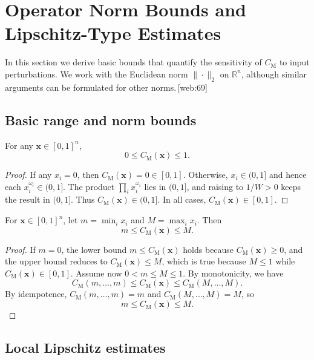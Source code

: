 \documentclass[11pt]{article}
\begin{document}
\section{Operator Norm Bounds and Lipschitz-Type Estimates}

In this section we derive basic bounds that quantify the sensitivity of $C_{\mathrm{M}}$ to input perturbations. 
We work with the Euclidean norm $\|\cdot\|_2$ on $\mathbb{R}^n$, although similar arguments can be formulated for other norms.\,[web:69] 

\subsection{Basic range and norm bounds}

\begin{proposition}[Range]
For any $\mathbf{x} \in [0,1]^n$, 
\[
0 \le C_{\mathrm{M}}(\mathbf{x}) \le 1.
\]
\end{proposition}

\begin{proof}
If any $x_i=0$, then $C_{\mathrm{M}}(\mathbf{x})=0\in[0,1]$. 
Otherwise, $x_i\in(0,1]$ and hence each $x_i^{\omega_i}\in(0,1]$. 
The product $\prod_i x_i^{\omega_i}$ lies in $(0,1]$, and raising to $1/W>0$ keeps the result in $(0,1]$. 
Thus $C_{\mathrm{M}}(\mathbf{x})\in(0,1]$. 
In all cases, $C_{\mathrm{M}}(\mathbf{x}) \in [0,1]$.
\end{proof}

\begin{proposition}
For $\mathbf{x} \in [0,1]^n$, let $m = \min_i x_i$ and $M = \max_i x_i$. 
Then
\[
m \le C_{\mathrm{M}}(\mathbf{x}) \le M.
\]
\end{proposition}

\begin{proof}
If $m=0$, the lower bound $m \le C_{\mathrm{M}}(\mathbf{x})$ holds because $C_{\mathrm{M}}(\mathbf{x}) \ge 0$, and the upper bound reduces to $C_{\mathrm{M}}(\mathbf{x})\le M$, which is true because $M \le 1$ while $C_{\mathrm{M}}(\mathbf{x})\in[0,1]$. 
Assume now $0 < m \le M \le 1$. 
By monotonicity, we have
\[
C_{\mathrm{M}}(m,\dots,m) \le C_{\mathrm{M}}(\mathbf{x}) \le C_{\mathrm{M}}(M,\dots,M).
\]
By idempotence, $C_{\mathrm{M}}(m,\dots,m) = m$ and $C_{\mathrm{M}}(M,\dots,M) = M$, so
\[
m \le C_{\mathrm{M}}(\mathbf{x}) \le M.
\]
\end{proof}

\subsection{Local Lipschitz estimates}
\end{document}
